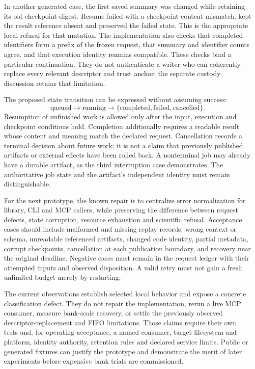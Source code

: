 In another generated case, the first saved summary was changed while retaining
its old checkpoint digest. Resume failed with a checkpoint-content mismatch,
kept the result reference absent and preserved the failed state. This is the
appropriate local refusal for that mutation. The implementation also checks
that completed identifiers form a prefix of the frozen request, that summary
and identifier counts agree, and that execution identity remains compatible.
These checks bind a particular continuation. They do not authenticate a writer
who can coherently replace every relevant descriptor and trust anchor; the
separate custody discussion retains that limitation. \citep{exec14_failure_implementation,exec14_failure_observations}

The proposed state transition can be expressed without assuming success:
\[
 \text{queued}\longrightarrow\text{running}
 \longrightarrow\{\text{completed},\text{failed},\text{cancelled}\}.
\]
Resumption of unfinished work is allowed only after the input, execution and
checkpoint conditions hold. Completion additionally requires a readable result
whose content and meaning match the declared request. Cancellation records a
terminal decision about future work; it is not a claim that previously published
artifacts or external effects have been rolled back. A nonterminal job may
already have a durable artifact, as the third interruption case demonstrates.
The authoritative job state and the artifact's independent identity must remain
distinguishable. \citep{exec14_failure_design}

For the next prototype, the known repair is to centralize error normalization
for library, CLI and MCP callers, while preserving the difference between
request defects, state corruption, resource exhaustion and scientific refusal.
Acceptance cases should include malformed and missing replay records, wrong
context or schema, unreadable referenced artifacts, changed code identity,
partial metadata, corrupt checkpoints, cancellation at each publication boundary,
and recovery near the original deadline. Negative cases must remain in the
request ledger with their attempted inputs and observed disposition. A valid
retry must not gain a fresh unlimited budget merely by restarting.
\citep{exec14_failure_design}

The current observations establish selected local behavior and expose a concrete
classification defect. They do not repair the implementation, rerun a live MCP
consumer, measure bank-scale recovery, or settle the previously observed
descriptor-replacement and FIFO limitations. Those claims require their own
tests and, for operating acceptance, a named consumer, target filesystem and
platform, identity authority, retention rules and declared service limits.
Public or generated fixtures can justify the prototype and demonstrate the
merit of later experiments before expensive bank trials are commissioned.
\citep{exec14_failure_design}
\label{exec14:failure-trials-end}


